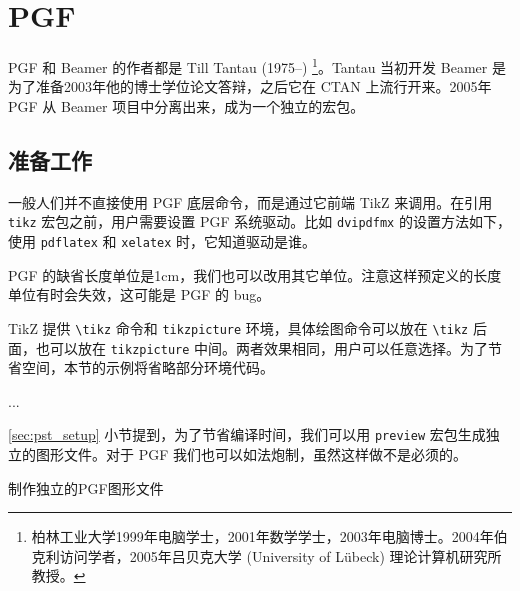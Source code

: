 \chapter{PGF}
\label{sec:pgf}

PGF 和 Beamer 的作者都是 Till Tantau (1975--)\indexTantau{} \footnote{柏林工业大学1999年电脑学士，2001年数学学士，2003年电脑博士。2004年伯克利访问学者，2005年吕贝克大学 (University of Lübeck) 理论计算机研究所教授。}。Tantau 当初开发 Beamer 是为了准备2003年他的博士学位论文答辩，之后它在 CTAN 上流行开来。2005年 PGF 从 Beamer 项目中分离出来，成为一个独立的宏包\citep{Tantau_pgf}。

\section{准备工作}

一般人们并不直接使用 PGF 底层命令，而是通过它前端 TikZ 来调用。在引用 \texttt{tikz} 宏包之前，用户需要设置 PGF 系统驱动。比如 \texttt{dvipdfmx} 的设置方法如下，使用 \texttt{pdflatex} 和 \texttt{xelatex} 时，它知道驱动是谁。

\begin{Code}[]
\def\pgfsysdriver{pgfsys-dvipdfmx.def}
\usepackage{tikz}
\end{Code}

PGF 的缺省长度单位是1cm，我们也可以改用其它单位。注意这样预定义的长度单位有时会失效，这可能是 PGF 的 bug。

\begin{Code}[]
\end{Code}

TikZ 提供 \verb|\tikz| 命令和 \texttt{tikzpicture} 环境，具体绘图命令可以放在 \verb|\tikz| 后面，也可以放在 \texttt{tikzpicture} 中间。两者效果相同，用户可以任意选择。为了节省空间，本节的示例将省略部分环境代码。

\begin{Code}[]
\tikz ...   %
\end{Code}

\ref{sec:pst_setup} 小节提到，为了节省编译时间，我们可以用 \texttt{preview} 宏包生成独立的图形文件。对于 PGF 我们也可以如法炮制，虽然这样做不是必须的。

\begin{example}[htbp]
\caption{制作独立的PGF图形文件}
\label{exa:pgf}
\end{example}

